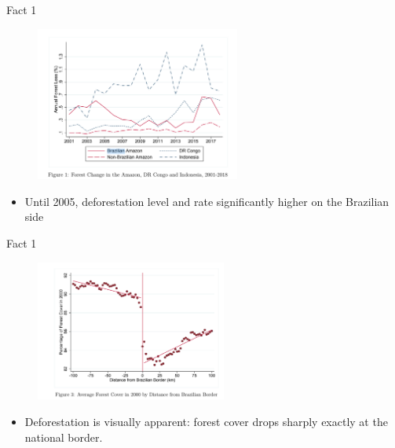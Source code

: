 \documentclass[11pt,notes=hide,aspectratio=169,mathserif]{beamer}
\begin{document}
\begin{frame}{Fact 1}
\begin{figure}
\centering
\includegraphics[width=0.6\textwidth]{../TA9/inputs/fig2.1.png}
\end{figure}
\begin{itemize}
\item Until 2005, deforestation level and rate significantly higher on the Brazilian side 
\end{itemize}
\end{frame}

\begin{frame}{Fact 1}
\begin{figure}
\centering
\includegraphics[width=0.56\textwidth]{../TA9/inputs/fig2.3.png}
\end{figure}
\begin{itemize}
\item Deforestation is visually apparent: forest cover drops sharply exactly at the national border.
\end{itemize}
\end{frame}
\end{document}

